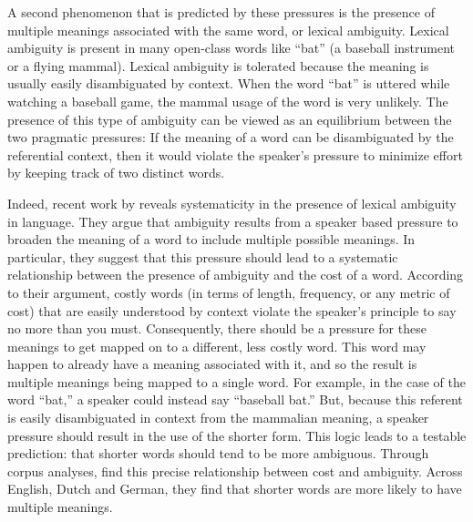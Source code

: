 A second phenomenon that is predicted by these pressures is the presence of multiple meanings associated with the same word, or lexical ambiguity. Lexical ambiguity is present in  many open-class words like ``bat'' (a baseball instrument or a flying mammal). Lexical ambiguity is tolerated because the meaning is usually easily disambiguated by context. When the word ``bat'' is uttered while watching a baseball game, the mammal usage of the word is very unlikely. The presence of this type of ambiguity can be viewed as an equilibrium between the two pragmatic pressures: If the meaning of a word can be disambiguated by the referential context, then it would violate the speaker's pressure to minimize effort by keeping track of two distinct words.

Indeed, recent work by  reveals systematicity in the presence of lexical ambiguity in language. They argue that ambiguity results from a speaker based pressure to broaden the meaning of a word to include multiple possible meanings. In particular, they suggest that this pressure should lead to a systematic relationship between the presence of ambiguity and the cost of a word. According to their argument, costly words (in terms of length, frequency, or any metric of cost) that are easily understood by context violate the speaker's principle to say no more than you must. Consequently, there should be a pressure for these meanings to get mapped on to a different, less costly word. This word may happen to already have a meaning associated with it, and so the result is multiple meanings being mapped to a single word. For example, in the case of the word ``bat,'' a speaker could instead say ``baseball bat.'' But, because this referent is easily disambiguated in context from the mammalian meaning, a speaker pressure should result in the use of the shorter form. This logic leads to a testable prediction: that shorter words should tend to be more ambiguous. Through corpus analyses,  find this precise relationship between cost and ambiguity. Across English, Dutch and German, they find that shorter words are more likely to have multiple meanings.


